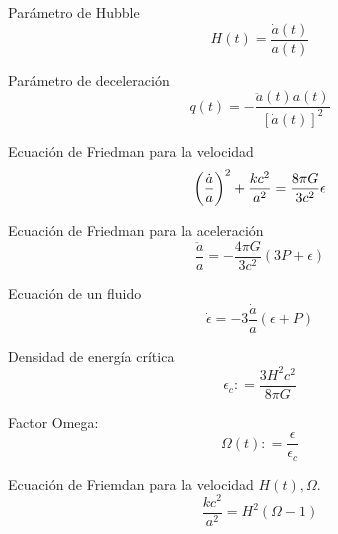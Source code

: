 \begin{multicols}{2}
\begin{Formulario}
    Parámetro de Hubble
	\begin{equation*}
		H (t)= \frac{\dot{a}(t)}{a(t)}
	\end{equation*}
\end{Formulario}

\begin{Formulario}
    Parámetro de deceleración
	\begin{equation*}
		q(t) = - \frac{\ddot{a}(t)a(t)}{[\dot{a}(t)]^2}
	\end{equation*}
\end{Formulario}

\begin{Formulario}
    Ecuación de Friedman para la velocidad
	\begin{equation*}
		\left( \frac{\dot{a}}{a} \right)^2 + \frac{kc^2}{a^2} = \frac{8 \pi G}{3c^2} \epsilon
	\end{equation*}
\end{Formulario}

\begin{Formulario}
    Ecuación de Friedman para la aceleración
	\begin{equation*}
		\frac{\ddot{a}}{a} =  - \frac{4 \pi G}{3c^2} (3P + \epsilon)
	\end{equation*}
\end{Formulario}

\begin{Formulario}
    Ecuación de un fluido
	\begin{equation*}
		\dot{\epsilon} = - 3 \frac{\dot{a}}{a} (\epsilon + P)
	\end{equation*}
\end{Formulario}

\begin{Formulario}
    Densidad de energía crítica
    \begin{equation*}
        \epsilon_c : = \frac{3H^2c^2}{8 \pi G}
    \end{equation*}
\end{Formulario}

\begin{Formulario}
    Factor Omega: 
\begin{equation*}
	\Omega(t) : = \frac{\epsilon}{\epsilon_c}
\end{equation*}
\end{Formulario}

\begin{Formulario}
    Ecuación de Friemdan para la velocidad  $H(t),\Omega$.
\begin{equation*}
	\frac{kc^2}{a^2} = H^2(\Omega -1)
\end{equation*}
\end{Formulario}


\end{multicols}
